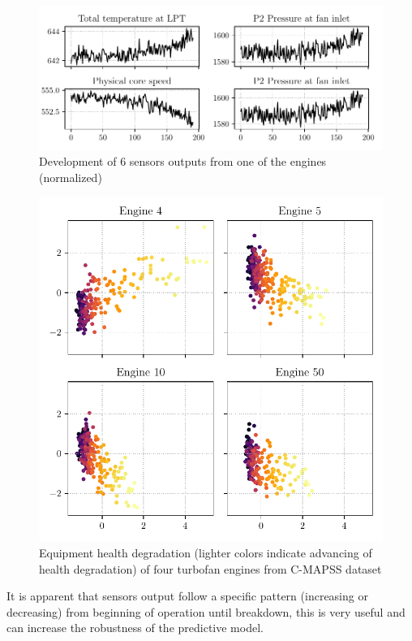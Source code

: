 \begin{figure}[h]
    \centering
    \includegraphics[width=\linewidth]{figures/sensors_plot.pdf}
    \caption{Development of 6 sensors outputs from one of the engines (normalized)}
    \label{fig:sensors-plot}
\end{figure}
\begin{figure}[H]
    \centering
    \includegraphics[width=.9\linewidth]{figures/pca-degradation.pdf}
    \caption{Equipment health degradation (lighter colors indicate advancing of health degradation) of four turbofan engines from C-MAPSS dataset}
    \label{fig:pca-degradation}
\end{figure}

It is apparent that sensors output follow a specific pattern (increasing or decreasing) from beginning of operation until breakdown, this is very useful and can increase the robustness of the predictive model.


